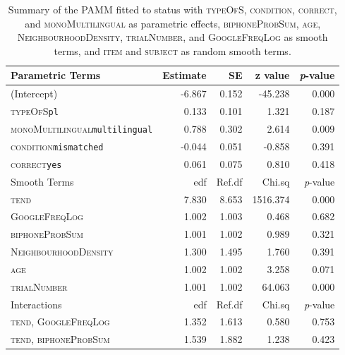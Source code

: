 \begin{table}\fontsize{10}{11}
\caption{Summary of the PAMM fitted to status with \textsc{typeOfS}, \textsc{condition}, \textsc{correct}, and \textsc{monoMultilingual} as parametric effects, \textsc{biphoneProbSum}, \textsc{age}, \textsc{NeighbourhoodDensity}, \textsc{trialNumber}, and \textsc{GoogleFreqLog} as smooth terms, and \textsc{item} and \textsc{subject} as random smooth terms.}
\label{tab:7.7}
\centering
\begin{tabular}{lrrrr} 
\lsptoprule
Parametric Terms             & Estimate & SE     & z value  & \textit{p}-value  \\ 
\midrule
(Intercept)                  & -6.867   & 0.152  & -45.238  & 0.000             \\
\textsc{typeOfS}\texttt{pl}                    & 0.133    & 0.101  & 1.321    & 0.187             \\
\textsc{monoMultilingual}\texttt{multilingual} & 0.788    & 0.302  & 2.614    & 0.009             \\
\textsc{condition}\texttt{mismatched}          & -0.044   & 0.051  & -0.858   & 0.391             \\
\textsc{correct}\texttt{yes}                   & 0.061    & 0.075  & 0.810    & 0.418             \\ 
\midrule
Smooth Terms                 & edf      & Ref.df & Chi.sq   & \textit{p}-value  \\ 
\midrule
\textsc{tend}                         & 7.830    & 8.653  & 1516.374 & 0.000             \\
\textsc{GoogleFreqLog}                & 1.002    & 1.003  & 0.468    & 0.682             \\
\textsc{biphoneProbSum}               & 1.001    & 1.002  & 0.989    & 0.321             \\
\textsc{NeighbourhoodDensity}         & 1.300    & 1.495  & 1.760    & 0.391             \\
\textsc{age}                          & 1.002    & 1.002  & 3.258    & 0.071             \\
\textsc{trialNumber}                  & 1.001    & 1.002  & 64.063   & 0.000             \\ 
\midrule
Interactions                 & edf      & Ref.df & Chi.sq   & \textit{p}-value  \\ 
\midrule
\textsc{tend,
  GoogleFreqLog}        & 1.352    & 1.613  & 0.580    & 0.753             \\
\textsc{tend,
  biphoneProbSum}       & 1.539    & 1.882  & 1.238    & 0.423             \\

\end{tabular}
\end{table}
